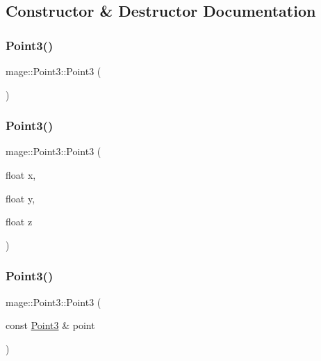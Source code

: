 \subsection{Constructor \& Destructor Documentation}
\hypertarget{structmage_1_1_point3_a2675c303e54c6047520bc1a298c7fef1}{}\label{structmage_1_1_point3_a2675c303e54c6047520bc1a298c7fef1} 
\subsubsection{\texorpdfstring{Point3()}{Point3()}\hspace{0.1cm}{\footnotesize\ttfamily [1/10]}}
{\footnotesize\ttfamily mage\+::\+Point3\+::\+Point3 (\begin{DoxyParamCaption}{ }\end{DoxyParamCaption})}

\hypertarget{structmage_1_1_point3_a754210fa30befab6db5957a8d9b397f2}{}\label{structmage_1_1_point3_a754210fa30befab6db5957a8d9b397f2} 
\subsubsection{\texorpdfstring{Point3()}{Point3()}\hspace{0.1cm}{\footnotesize\ttfamily [2/10]}}
{\footnotesize\ttfamily mage\+::\+Point3\+::\+Point3 (\begin{DoxyParamCaption}\item[{float}]{x,  }\item[{float}]{y,  }\item[{float}]{z }\end{DoxyParamCaption})}

\hypertarget{structmage_1_1_point3_ad2e95e6eaa32339663e35f936990eb0c}{}\label{structmage_1_1_point3_ad2e95e6eaa32339663e35f936990eb0c} 
\subsubsection{\texorpdfstring{Point3()}{Point3()}\hspace{0.1cm}{\footnotesize\ttfamily [3/10]}}
{\footnotesize\ttfamily mage\+::\+Point3\+::\+Point3 (\begin{DoxyParamCaption}\item[{const \hyperlink{structmage_1_1_point3}{Point3} \&}]{point }\end{DoxyParamCaption})}


